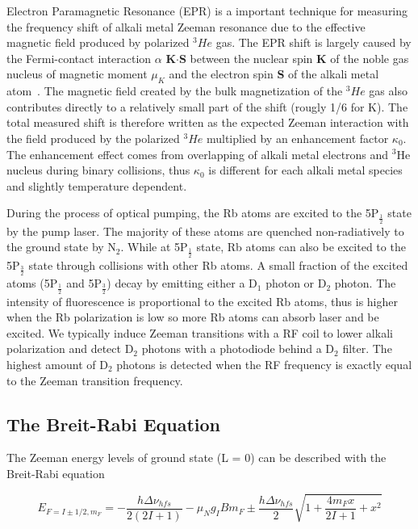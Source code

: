 Electron Paramagnetic Resonance (EPR) is a important technique for measuring the frequency shift of alkali metal Zeeman resonance due to the effective magnetic field produced by polarized $^{3}He$ gas. The EPR shift is largely caused by the Fermi-contact interaction $\alpha$ {\bf K$\cdot$S} between the nuclear spin {\bf K} of the noble gas nucleus of magnetic moment $\mu_{K}$ and the electron spin {\bf S} of the alkali metal atom~\cite{PhysRevA.71.013414}. The magnetic field created by the bulk magnetization of the $^{3}He$ gas also contributes directly to a relatively small part of the shift (rougly 1/6 for K). The total measured shift is therefore written as the expected Zeeman interaction with the field produced by the polarized $^{3}He$ multiplied by an enhancement factor $\kappa_{0}$. The enhancement effect comes from overlapping of alkali metal electrons and $^{3}$He nucleus during binary collisions, thus $\kappa_{0}$ is different for each alkali metal species and slightly temperature dependent.

During the process of optical pumping, the Rb atoms are excited to the 5P$_{\frac{1}{2}}$ state by the pump laser. The majority of these atoms are quenched non-radiatively to the ground state by N$_{2}$. While at 5P$_{\frac{1}{2}}$ state, Rb atoms can also be excited to the 5P$_{\frac{3}{2}}$ state through collisions with other Rb atoms. A small fraction of the excited atoms (5P$_{\frac{1}{2}}$ and 5P$_{\frac{3}{2}}$) decay by emitting either a D$_{1}$ photon or D$_{2}$ photon. The intensity of fluorescence is proportional to the excited Rb atoms, thus is higher when the Rb polarization is low so more Rb atoms can absorb laser and be excited. We typically induce Zeeman transitions with a RF coil to lower alkali polarization and detect D$_{2}$ photons with a photodiode behind a D$_{2}$ filter. The highest amount of D$_{2}$ photons is detected when the RF frequency is exactly equal to the Zeeman transition frequency.

\subsection{The Breit-Rabi Equation}

The Zeeman energy levels of ground state (L = 0) can be described with the Breit-Rabi equation

\begin{equation}
E_{F=I\pm 1/2, m_{F}}=-\frac{h\Delta \nu_{hfs}}{2(2I+1)}-\mu_{N}g_{I}Bm_{F}\pm \frac{h\Delta \nu_{hfs}}{2}\sqrt{1+\frac{4m_{F}x}{2I+1} +x^{2}}
\end{equation}

